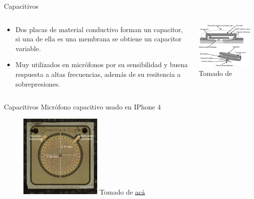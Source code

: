 \documentclass[aspectratio=169]{beamer}
\begin{document}
\begin{frame}{Capacitivos}
    \begin{columns}[c, onlytextwidth]
        \begin{column}{0.5\textwidth}
            \begin{itemize}
                \item Dos placas de material conductivo forman un capacitor, si una de ella es una membrana se obtiene un capacitor variable. 
                \item Muy utilizados en micrófonos por su sensibilidad y buena respuesta a altas frecuencias, además de su resitencia a sobrepresiones. 
            \end{itemize}
        \end{column}
        \begin{column}{0.5\textwidth}
            \centering
            \includegraphics[width=6cm]{fig/Presion/memscapacitive.png}
             \\ \tiny{Tomado de \cite{pallas2012sensors}}
        \end{column}
    \end{columns}
\end{frame}

\begin{frame}{Capacitivos}
    Micrófono capacitivo usado en IPhone 4
    \begin{figure}
        \centering
        \includegraphics[width=4cm]{fig/Presion/memsmic.jpg}
        \tiny{Tomado de \href{https://www.memsjournal.com/2011/03/overview-of-mems-microphone-technologies-for-consumer-applications.html}{acá}}
    \end{figure}
\end{frame}
\end{document}
